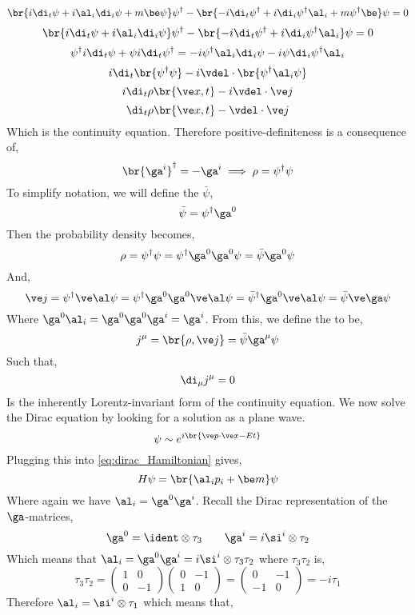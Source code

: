 \documentclass{article}
\begin{document}
\[ \br{i \di_t \psi + i \al_i \di_i \psi + m \be \psi} \psi^{\dagger} - \br{- i \di_t \psi^{\dagger} + i \di_i \psi^{\dagger} \al_i  + m \psi^{\dagger} \be} \psi  = 0 \]
\[ \br{i \di_t \psi + i \al_i \di_i \psi} \psi^{\dagger} - \br{- i \di_t \psi^{\dagger} + i \di_i \psi^{\dagger} \al_i} \psi  = 0 \]
\[ \psi^{\dagger} i \di_t \psi + \psi i \di_t \psi^{\dagger}  = - i \psi^{\dagger} \al_i \di_i \psi- i \psi \di_{i} \psi^{\dagger} \al_i   \]
\[ i \di_{t} \br{\psi^{\dagger} \psi} - i \vdel \cdot \br{\psi^{\dagger} \al_i \psi} \]
\[ i \di_{t} \rho\br{\ve x, t} - i \vdel \cdot \ve j \]
\[ \di_{t} \rho\br{\ve x, t} - \vdel \cdot \ve j \]
Which is the continuity equation. Therefore positive-definiteness is a consequence of,
\[ \br{\ga^{i}}^{\dagger} = - \ga^{i} \implies \rho = \psi^{\dagger} \psi \]
To simplify notation, we will define the  $\bar{\psi}$,
\[ \bar{\psi} = \psi^{\dagger} \ga^{0} \]
Then the probability density becomes,
\[ \rho = \psi^{\dagger}\psi = \psi^{\dagger} \ga^{0} \ga^{0} \psi = \bar \psi \ga^{0} \psi \]
And,
\[ \ve j = \psi^{\dagger} \ve \al \psi = \psi^{\dagger} \ga^{0} \ga^{0} \ve \al \psi = \bar \psi^{\dagger} \ga^{0} \ve \al \psi = \bar \psi \ve \ga \psi \]
Where $\ga^{0}\al_{i} = \ga^{0} \ga^{0} \ga^{i} = \ga^{i}$. From this, we define the  to be,
\[ j^{\mu} = \br{\rho ,\ve j} = \bar \psi \ga^{\mu} \psi \]
Such that,
\[ \di_{\mu} j^{\mu} = 0 \]
Is the inherently Lorentz-invariant form of the continuity equation. We now solve the Dirac equation by looking for a solution as a plane wave.
\[ \psi \sim e^{i\br{\ve p \cdot \ve x - E t}}\]
Plugging this into \cref{eq:dirac_Hamiltonian} gives,
\[ H\psi = \br{\al_i p_i + \be m}\psi \]
Where again we have $\al_i = \ga^{0} \ga^{i}$. Recall the Dirac representation of the $\ga$-matrices,
\[ \ga^{0} = \ident \otimes \tau_3 \qquad \ga^{i} = i \si^{i} \otimes \tau_{2} \]
Which means that $\al_i = \ga^{0} \ga^{i} = i \si^{i} \otimes \tau_3 \tau_2$ where $\tau_3 \tau_2$ is,
\[ \tau_3 \tau_2 = \begin{pmatrix}
    1 & 0 \\ 0 & -1
\end{pmatrix}\begin{pmatrix}
    0 & -1 \\ 1 & 0
\end{pmatrix} = \begin{pmatrix}
    0 & -1 \\ -1 & 0
\end{pmatrix} = -i\tau_1 \]
Therefore $\al_i = \si^{i} \otimes \tau_{1}$ which means that,
\end{document}
